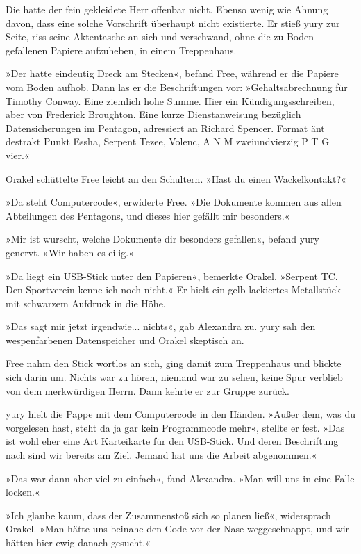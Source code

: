 Die hatte der fein gekleidete Herr offenbar nicht. Ebenso wenig wie Ahnung davon, dass eine solche Vorschrift überhaupt nicht existierte. Er stieß yury zur Seite, riss seine Aktentasche an sich und verschwand, ohne die zu Boden gefallenen Papiere aufzuheben, in einem Treppenhaus.

»Der hatte eindeutig Dreck am Stecken«, befand Free, während er die Papiere vom Boden aufhob. Dann las er die Beschriftungen vor: »Gehaltsabrechnung für Timothy Conway. Eine ziemlich hohe Summe. Hier ein Kündigungsschreiben, aber von Frederick Broughton. Eine kurze Dienstanweisung bezüglich Datensicherungen im Pentagon, adressiert an Richard Spencer. Format änt destrakt Punkt Essha, Serpent Tezee, Volenc, A N M zweiundvierzig P T G vier.«

Orakel schüttelte Free leicht an den Schultern. »Hast du einen Wackelkontakt?«

»Da steht Computercode«, erwiderte Free. »Die Dokumente kommen aus allen Abteilungen des Pentagons, und dieses hier gefällt mir besonders.«

»Mir ist wurscht, welche Dokumente dir besonders gefallen«, befand yury genervt. »Wir haben es eilig.«

»Da liegt ein USB-Stick unter den Papieren«, bemerkte Orakel. »Serpent TC. Den Sportverein kenne ich noch nicht.« Er hielt ein gelb lackiertes Metallstück mit schwarzem Aufdruck in die Höhe.

»Das sagt mir jetzt irgendwie... nichts«, gab Alexandra zu. yury sah den wespenfarbenen Datenspeicher und Orakel skeptisch an.

Free nahm den Stick wortlos an sich, ging damit zum Treppenhaus und blickte sich darin um. Nichts war zu hören, niemand war zu sehen, keine Spur verblieb von dem merkwürdigen Herrn. Dann kehrte er zur Gruppe zurück.

yury hielt die Pappe mit dem Computercode in den Händen. »Außer dem, was du vorgelesen hast, steht da ja gar kein Programmcode mehr«, stellte er fest. »Das ist wohl eher eine Art Karteikarte für den USB-Stick. Und deren Beschriftung nach sind wir bereits am Ziel. Jemand hat uns die Arbeit abgenommen.«

»Das war dann aber viel zu einfach«, fand Alexandra. »Man will uns in eine Falle locken.«

»Ich glaube kaum, dass der Zusammenstoß sich so planen ließ«, widersprach Orakel. »Man hätte uns beinahe den Code vor der Nase weggeschnappt, und wir hätten hier ewig danach gesucht.«

